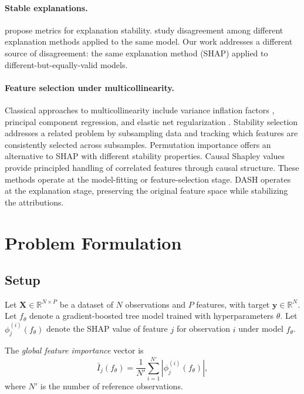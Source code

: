 \documentclass[11pt]{article}
\newcommand{\dash}{\textsc{DASH}}
\begin{document}
\paragraph{Stable explanations.}
\citet{alvarez2018towards} propose metrics for explanation stability.
\citet{krishna2022disagreement} study disagreement among different
explanation methods applied to the same model. Our work addresses a
different source of disagreement: the same explanation method (SHAP)
applied to different-but-equally-valid models.

\paragraph{Feature selection under multicollinearity.}
Classical approaches to multicollinearity include variance inflation
factors \citep{obrien2007caution}, principal component regression, and
elastic net regularization \citep{zou2005regularization}. Stability
selection \citep{meinshausen2010stability} addresses a related problem
by subsampling data and tracking which features are consistently
selected across subsamples. Permutation importance
\citep{altmann2010permutation} offers an alternative to SHAP with
different stability properties. Causal Shapley values
\citep{heskes2020causal} provide principled handling of correlated
features through causal structure. These methods operate at the
model-fitting or feature-selection stage. \dash{} operates at the
explanation stage, preserving the original feature space while
stabilizing the attributions.


\section{Problem Formulation}
\label{sec:problem}

\subsection{Setup}

Let $\mathbf{X} \in \mathbb{R}^{N \times P}$ be a dataset of $N$
observations and $P$ features, with target $\mathbf{y} \in \mathbb{R}^N$.
Let $f_\theta$ denote a gradient-boosted tree model trained with
hyperparameters $\theta$. Let $\phi_j^{(i)}(f_\theta)$ denote the SHAP
value of feature $j$ for observation $i$ under model $f_\theta$.

The \emph{global feature importance} vector is
\begin{equation}
  \bar{I}_j(f_\theta) = \frac{1}{N'} \sum_{i=1}^{N'} |\phi_j^{(i)}(f_\theta)|,
  \label{eq:global_importance}
\end{equation}
where $N'$ is the number of reference observations.
\end{document}
